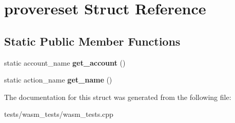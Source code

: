 \hypertarget{structprovereset}{}\section{provereset Struct Reference}
\label{structprovereset}
\subsection*{Static Public Member Functions}
\begin{DoxyCompactItemize}
\item 
\mbox{\label{structprovereset_a7774522835c846b2bb327f7f3bc20410}} 
static account\+\_\+name {\bfseries get\+\_\+account} ()
\item 
\mbox{\label{structprovereset_af77576f3a7db950b8ed8301063484135}} 
static action\+\_\+name {\bfseries get\+\_\+name} ()
\end{DoxyCompactItemize}


The documentation for this struct was generated from the following file\+:\begin{DoxyCompactItemize}
\item 
tests/wasm\+\_\+tests/wasm\+\_\+tests.\+cpp\end{DoxyCompactItemize}
